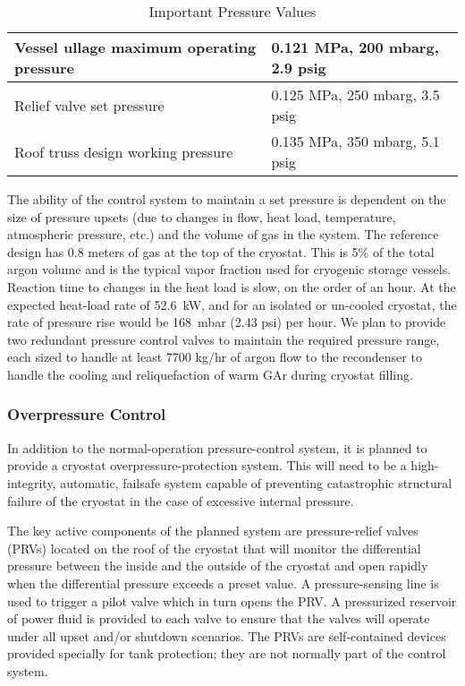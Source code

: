 \begin{table}
\centering
\caption{Important Pressure Values}
\label{table:pressure-values}\begin{tabular}[htbp]{|l|l|}
\hline 
Vessel ullage maximum operating pressure & 0.121 MPa, 200 mbarg, 2.9 psig\\
\hline
Relief valve set pressure& 0.125 MPa, 250 mbarg, 3.5 psig\\
\hline
Roof truss design working pressure& 0.135 MPa, 350 mbarg, 5.1 psig\\
\hline
\end{tabular} 

\end{table}

The ability of the control system to maintain a set pressure is dependent on the size of pressure upsets (due to changes in flow, heat load, temperature, atmospheric pressure, etc.) and the volume of gas in the system.  The reference design has 0.8 meters of gas at the top of the cryostat.  This is 5\% of the total argon volume and is the typical vapor fraction used for cryogenic storage vessels.  Reaction time to changes in the heat load is slow, on the order of an hour.  At the expected heat-load rate of 52.6~kW, and for an isolated or un-cooled cryostat, the rate of pressure rise would be 168~mbar (2.43 psi) per hour. 
We plan to provide two redundant pressure control valves to maintain the required pressure range, each sized to handle at least 7700 kg/hr of argon flow to the recondenser to handle the cooling and
reliquefaction of warm GAr during cryostat filling.


\subsubsection{Overpressure Control}

In addition to the normal-operation pressure-control system, it is planned to provide a cryostat overpressure-protection system.  This will need to be a high-integrity, automatic, failsafe system capable of preventing catastrophic structural failure of the cryostat in the case of excessive internal pressure.

The key active components of the planned system are pressure-relief valves (PRVs) located on the roof of the cryostat that will monitor the differential pressure between the inside and the outside of the cryostat and open rapidly when the 
differential pressure exceeds a preset value. 
 A pressure-sensing line is used to trigger a pilot valve which in turn opens the PRV.
A pressurized reservoir of power fluid is provided to each valve to ensure that the valves will operate under all upset and/or shutdown scenarios.  The PRVs are self-contained devices provided specially for tank protection; they are not normally part of the control system. 

